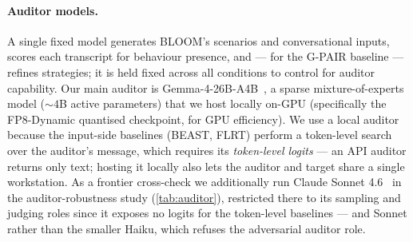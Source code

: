 \documentclass{article}
\theoremstyle{plain}
\theoremstyle{definition}
\theoremstyle{remark}
\begin{document}
\paragraph{Auditor models.}
A single fixed model generates BLOOM's scenarios and conversational inputs, scores each transcript for behaviour presence, and --- for the G-PAIR baseline --- refines strategies; it is held fixed across all conditions to control for auditor capability. Our main auditor is Gemma-4-26B-A4B~\citep{gemma2026gemma4}, a sparse mixture-of-experts model (${\sim}4$B active parameters) that we host locally on-GPU (specifically the FP8-Dynamic quantised checkpoint, for GPU efficiency). We use a local auditor because the input-side baselines (BEAST, FLRT) perform a token-level search over the auditor's message, which requires its \emph{token-level logits} --- an API auditor returns only text; hosting it locally also lets the auditor and target share a single workstation. As a frontier cross-check we additionally run Claude Sonnet 4.6~\citep{anthropic2026claude} in the auditor-robustness study (\cref{tab:auditor}), restricted there to its sampling and judging roles since it exposes no logits for the token-level baselines --- and Sonnet rather than the smaller Haiku, which refuses the adversarial auditor role.
\end{document}

